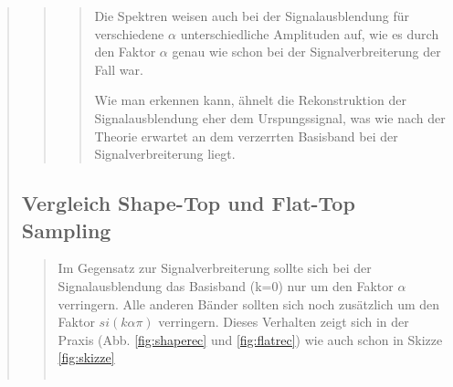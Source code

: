 \begin{quote}
\begin{quote}
\begin{quote}
             Die Spektren weisen auch bei der Signalausblendung für verschiedene $\alpha$ unterschiedliche Amplituden
             auf, wie es durch den Faktor $\alpha$ genau wie schon bei der Signalverbreiterung der Fall war.
             
             
             Wie man erkennen kann, ähnelt die Rekonstruktion der Signalausblendung eher dem Urspungssignal, was wie
             nach der Theorie erwartet an dem verzerrten Basisband bei der Signalverbreiterung liegt.
             
             
        \end{quote}
        
        
        
    \end{quote}
    
    \subsection{Vergleich Shape-Top und Flat-Top Sampling}
      \begin{quote}
      

                      
             Im Gegensatz zur Signalverbreiterung sollte sich bei der Signalausblendung das Basisband (k=0) nur um den
             Faktor $\alpha$ verringern.
             Alle anderen Bänder sollten sich noch zusätzlich um den Faktor $si(k\alpha\pi)$ verringern. %
             Dieses Verhalten zeigt sich in der Praxis (Abb. \ref{fig:shaperec} und \ref{fig:flatrec}) wie auch schon
             in Skizze \ref{fig:skizze}
             
             
             
             
            \begin{center}
            \begin{tabular}{ll}
            

\end{tabular}
\end{center}
\end{quote}
\end{quote}
